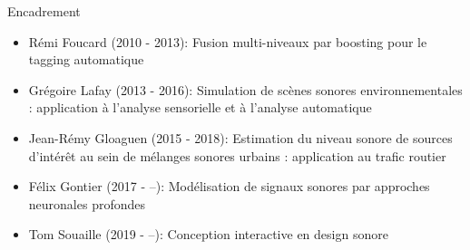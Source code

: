 \begin{frame}{Encadrement}
\begin{itemize}
  \item Rémi Foucard (2010 - 2013): \og Fusion multi-niveaux par boosting pour le tagging automatique \fg
  \item Grégoire Lafay (2013 - 2016): \og Simulation de scènes sonores environnementales : application à l'analyse sensorielle et à l'analyse automatique \fg
  \item Jean-Rémy Gloaguen (2015 - 2018): \og Estimation du niveau sonore de sources d'intérêt au sein de mélanges sonores urbains : application au trafic routier \fg
  \item Félix Gontier (2017 - --): \og Modélisation de signaux sonores par approches neuronales profondes \fg
  \item Tom Souaille (2019 - --): \og Conception interactive en design sonore \fg
\end{itemize}
\end{frame}